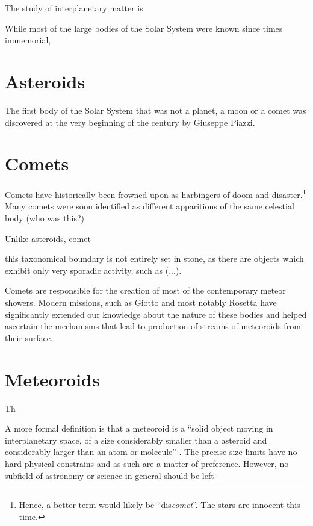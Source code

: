 
The study of interplanetary matter is 

While most of the large bodies of the Solar System were known since times immemorial,

\section{Asteroids} \label{aa}
    The first body of the Solar System that was not a planet, a moon or a comet was discovered at
    the very beginning of the  century by Giuseppe Piazzi.

\section{Comets} \label{ac}
    Comets have historically been frowned upon as harbingers of doom and disaster.\footnote{Hence,
    a better term would likely be ``dis\textit{comet}''. The stars are innocent this time.}
    Many comets were soon identified as different apparitions of the same celestial body (who was this?)

    Unlike asteroids, comet

    this taxonomical boundary is not entirely set in stone, as there are objects which exhibit
    only very sporadic activity, such as (...).

    Comets are responsible for the creation of most of the contemporary meteor showers.
    Modern missions, such as Giotto and most notably Rosetta have significantly extended our knowledge
    about the nature of these bodies and helped ascertain the mechanisms that lead to production
    of streams of meteoroids from their surface.

\section{Meteoroids} \label{am}
    Th

    A more formal definition is that a meteoroid is a ``solid object moving in interplanetary space,
    of a size considerably smaller than a asteroid and considerably larger than an atom or molecule'' \cite{imo-glossary}.
    The precise size limits have no hard physical constrains and as such are a matter of preference.
    However, no subfield of astronomy or science in general should be left

